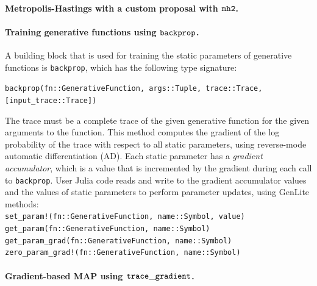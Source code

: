 \paragraph{Metropolis-Hastings with a custom proposal with $\mbox{\texttt{mh2}}$.}

\paragraph{Training generative functions using $\mathtt{backprop}{}$.} \label{sec:training}
A building block that is used for training the static parameters of generative functions is \texttt{backprop}, which has the following type signature:
\begin{center}
    \texttt{backprop(fn::GenerativeFunction, args::Tuple, trace::Trace, [input\_trace::Trace])}
\end{center}
The trace must be a complete trace of the given generative function for the given arguments to the function.
This method computes the gradient of the log probability of the trace with respect to all static parameters, using reverse-mode automatic differentiation (AD).
Each static parameter has a \emph{gradient accumulator}, which is a value that is incremented by the gradient during each call to \texttt{backprop}.
User Julia code reads and write to the gradient accumulator values and the values of static parameters to perform parameter updates, using GenLite methods:\\
\texttt{set\_param!(fn::GenerativeFunction, name::Symbol, value)}\\
\texttt{get\_param(fn::GenerativeFunction, name::Symbol)}\\
\texttt{get\_param\_grad(fn::GenerativeFunction, name::Symbol)}\\
\texttt{zero\_param\_grad!(fn::GenerativeFunction, name::Symbol)}

\paragraph{Gradient-based MAP using $\mathtt{trace\_gradient}{}$.}
